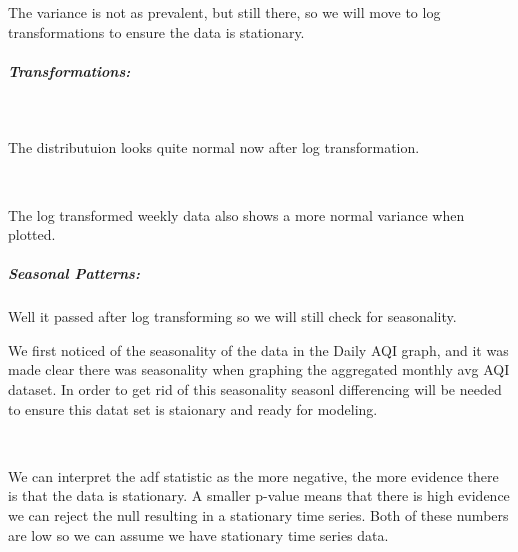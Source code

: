 \documentclass[11pt, twocolumn]{article}
\begin{document}
    The variance is not as prevalent, but still there, so we will move to
log transformations to ensure the data is stationary.

    \subparagraph{Transformations:}\label{transformations}

    \begin{center}
    \end{center}
    { \hspace*{\fill} \\}
    
    The distributuion looks quite normal now after log transformation.

    \begin{center}
    \end{center}
    { \hspace*{\fill} \\}
    
    The log transformed weekly data also shows a more normal variance when
plotted.

    \subparagraph{Seasonal Patterns:}\label{seasonal-patterns}

    Well it passed after log transforming so we will still check for
seasonality.

    We first noticed of the seasonality of the data in the Daily AQI graph,
and it was made clear there was seasonality when graphing the aggregated
monthly avg AQI dataset. In order to get rid of this seasonality seasonl
differencing will be needed to ensure this datat set is staionary and
ready for modeling.

    \begin{center}
    \end{center}
    { \hspace*{\fill} \\}
    
    We can interpret the adf statistic as the more negative, the more
evidence there is that the data is stationary. A smaller p-value means
that there is high evidence we can reject the null resulting in a
stationary time series. Both of these numbers are low so we can assume
we have stationary time series data.

    \begin{center}
    \end{center}
    { \hspace*{\fill} \\}
    
\end{document}
